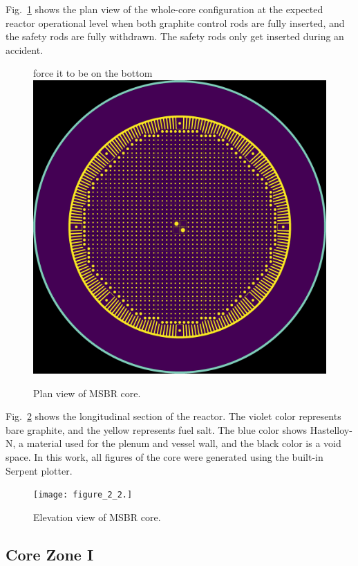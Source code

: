 \documentclass{anstrans}
\begin{document}
Fig.~\ref{fig:plan} shows the plan view of the whole-core configuration at the 
expected reactor operational level when both graphite control rods are fully 
inserted, and the safety rods are fully withdrawn. The safety rods only get 
inserted during an accident.  \begin{figure}[htbp!] %
        force it to be on the bottom
  \centering
  \vspace{-0.3em}
  \includegraphics[width=0.95\linewidth]{figure_2_1.png}
  \caption{Plan view of \gls{MSBR} core.}
  \vspace{-0.6em}
  \label{fig:plan}
\end{figure}
\FloatBarrier
Fig.~\ref{fig:elevation} shows the longitudinal section of the reactor. The 
violet color represents bare graphite, and the yellow represents fuel salt. The 
blue color shows Hastelloy-N, a material used for the plenum and vessel wall, 
and the black color is a void space. In this work, all figures of the core were 
generated using the built-in Serpent plotter.

\begin{figure}[htbp!] %
  \centering
  \texttt{[image: figure\_2\_2.]}
  \caption{Elevation view of \gls{MSBR} core.}
  \label{fig:elevation}
\end{figure}


\subsection{Core Zone I}
\end{document}
